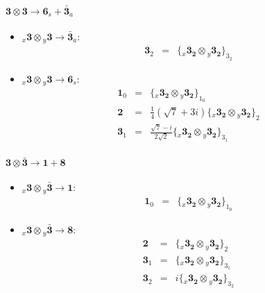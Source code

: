 \documentclass[english]{article}
\newcommand{\rep}[1]{\mathbf{#1}}
\newcommand{\repx}[2]{{}_{#2}\mathbf{#1}}
\newcommand{\subcg}[3]{\big\{ \repx{#1}{x}\otimes\repx{#2}{y}\big\}^{}_{#3}}
\begin{document}
\paragraph*{\Large $\rep{3}\otimes\rep{3}\to\rep{6}_s+\rep{\bar{3}}_a$}
\begin{itemize}
\item $\repx{3}{x}\otimes\repx{3}{y}\to\rep{\bar{3}}_{a}$:
\begin{eqnarray*}
\rep{3}_{2} &=& \subcg{3_{2}}{3_{2}}{3_{2}}
\end{eqnarray*}
\item $\repx{3}{x}\otimes\repx{3}{y}\to\rep{6}_{s}$:
\begin{eqnarray*}
\rep{1}_{0} &=& \subcg{3_{2}}{3_{2}}{1_{0}}
\\
\rep{2} &=& \frac{1}{4} \left(\sqrt{7}+3 i\right)\subcg{3_{2}}{3_{2}}{2}
\\
\rep{3}_{1} &=& \frac{\sqrt{7}-i}{2 \sqrt{2}}\subcg{3_{2}}{3_{2}}{3_{1}}
\end{eqnarray*}
\end{itemize}
\paragraph*{\Large $\rep{3}\otimes\rep{\bar{3}}\to\rep{1}+\rep{8}$}
\begin{itemize}
\item $\repx{3}{x}\otimes\repx{\bar{3}}{y}\to\rep{1}$:
\begin{eqnarray*}
\rep{1}_{0} &=& \subcg{3_{2}}{3_{2}}{1_{0}}
\end{eqnarray*}
\item $\repx{3}{x}\otimes\repx{\bar{3}}{y}\to\rep{8}$:
\begin{eqnarray*}
\rep{2} &=& \subcg{3_{2}}{3_{2}}{2}
\\
\rep{3}_{1} &=& \subcg{3_{2}}{3_{2}}{3_{1}}
\\
\rep{3}_{2} &=& i\subcg{3_{2}}{3_{2}}{3_{2}}
\end{eqnarray*}
\end{itemize}
\end{document}
